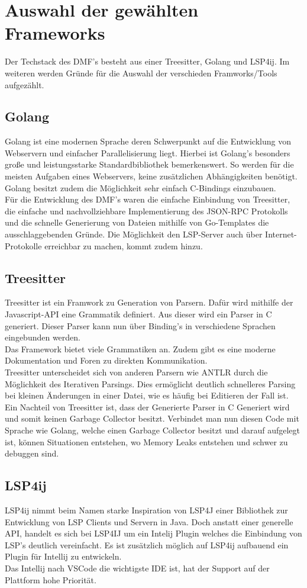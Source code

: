 \documentclass{article}
\begin{document}
\section{Auswahl der gewählten Frameworks}
Der Techstack des DMF's besteht aus einer Treesitter, Golang und LSP4ij. Im weiteren werden Gründe für die Auswahl der verschieden Framworks/Tools aufgezählt.
\subsection{Golang}
Golang ist eine modernen Sprache deren Schwerpunkt auf die Entwicklung von Webservern und einfacher Parallelisierung liegt.
Hierbei ist Golang's besonders große und leistungsstarke Standardbibliothek bemerkenswert. So werden für die meisten Aufgaben eines Webservers, keine zusätzlichen Abhängigkeiten benötigt. \\
Golang besitzt zudem die Möglichkeit sehr einfach C-Bindings einzubauen. \\
Für die Entwicklung des DMF's waren die einfache Einbindung von Treesitter, die einfache und nachvollziehbare Implementierung des JSON-RPC Protokolls und die schnelle Generierung von Dateien mithilfe von Go-Templates die ausschlaggebenden Gründe. Die Möglichkeit den LSP-Server auch über Internet-Protokolle  erreichbar zu machen, kommt zudem hinzu. \\
\subsection{Treesitter}
Treesitter ist ein Framwork zu Generation von Parsern. Dafür wird mithilfe der Javascript-API eine Grammatik definiert. Aus dieser wird ein Parser in C generiert. Dieser Parser kann nun über Binding's in verschiedene Sprachen eingebunden werden. \\
Das Framework bietet viele Grammatiken an. Zudem gibt es eine moderne Dokumentation und Foren zu direkten Kommunikation. \\
Treesitter unterscheidet sich von anderen Parsern wie ANTLR durch die Möglichkeit des Iterativen Parsings. Dies ermöglicht deutlich schnelleres Parsing bei kleinen Änderungen in einer Datei, wie es häufig bei Editieren der Fall ist. \\
Ein Nachteil von Treesitter ist, dass der Generierte Parser in C Generiert wird und somit keinen Garbage Collector besitzt. Verbindet man nun diesen Code mit Sprache wie Golang, welche einen Garbage Collector besitzt und darauf aufgelegt ist, können Situationen entstehen, wo Memory Leaks entstehen und schwer zu debuggen sind.
\subsection{LSP4ij}
LSP4ij nimmt beim Namen starke Inspiration von LSP4J einer Bibliothek zur Entwicklung von LSP Clients und Servern in Java. Doch anstatt einer generelle API, handelt es sich bei LSP4IJ um ein Intelij Plugin welches die Einbindung von LSP's deutlich vereinfacht. Es ist zusätzlich möglich auf LSP4ij aufbauend ein Plugin für Intellij zu entwickeln. \\
Das Intellij nach VSCode die wichtigste IDE ist, hat der Support auf der Plattform hohe Priorität.
\end{document}
